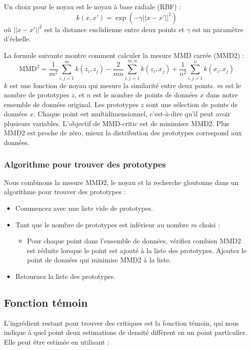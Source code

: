 Un choix pour le noyau est le noyau à base radiale (RBF) :
\[
k(x, x') = \exp\left(-\gamma ||x - x'||^2\right)
\]
où \(||x - x'||^2\) est la distance euclidienne entre deux points et \(\gamma\) est un paramètre d'échelle.

La formule suivante montre comment calculer la mesure MMD carrée (MMD2) :
\[
\text{MMD}^2 = \frac{1}{m^2} \sum_{i,j=1}^m k(z_i, z_j) - \frac{2}{mn} \sum_{i,j=1}^{m,n} k(z_i, x_j) + \frac{1}{n^2} \sum_{i,j=1}^n k(x_i, x_j)
\]
\(k\) est une fonction de noyau qui mesure la similarité entre deux points. \(m\) est le nombre de prototypes \(z\), et \(n\) est le nombre de points de données \(x\) dans notre ensemble de données original. Les prototypes \(z\) sont une sélection de points de données \(x\). Chaque point est multidimensionnel, c'est-à-dire qu'il peut avoir plusieurs variables. L'objectif de MMD-critic est de minimiser MMD2. Plus MMD2 est proche de zéro, mieux la distribution des prototypes correspond aux données.

\subsubsection{Algorithme pour trouver des prototypes}
Nous combinons la mesure MMD2, le noyau et la recherche gloutonne dans un algorithme pour trouver des prototypes :

\begin{itemize}
    \item Commencez avec une liste vide de prototypes.
    \item Tant que le nombre de prototypes est inférieur au nombre \(m\) choisi :
    \begin{itemize}
        \item Pour chaque point dans l'ensemble de données, vérifiez combien MMD2 est réduite lorsque le point est ajouté à la liste des prototypes. Ajoutez le point de données qui minimise MMD2 à la liste.
    \end{itemize}
    \item Retournez la liste des prototypes.
\end{itemize}

\subsection{Fonction témoin}
L'ingrédient restant pour trouver des critiques est la fonction témoin, qui nous indique à quel point deux estimations de densité diffèrent en un point particulier. Elle peut être estimée en utilisant :

